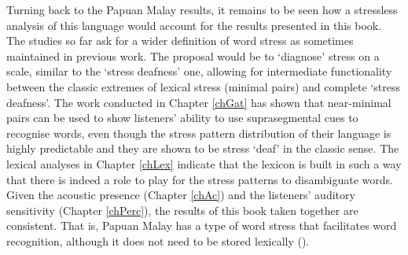 Turning back to the Papuan Malay results, it remains to be seen how a stressless analysis of this language would account for the results presented in this book. The studies so far ask for a wider definition of word stress as sometimes maintained in previous work. The proposal would be to `diagnose' stress on a scale, similar to the `stress deafness' one, allowing for intermediate functionality between the classic extremes of lexical stress (minimal pairs) and complete `stress deafness'. The work conducted in Chapter \ref{chGat} has shown that near-minimal pairs can be used to show listeners' ability to use suprasegmental cues to recognise words, even though the stress pattern distribution of their language is highly predictable and they are shown to be stress `deaf' in the classic sense. The lexical analyses in Chapter \ref{chLex} indicate that the lexicon is built in such a way that there is indeed a role to play for the stress patterns to disambiguate words. Given the acoustic presence (Chapter \ref{chAc}) and the listeners' auditory sensitivity (Chapter \ref{chPerc}), the results of this book taken together are consistent. That is, Papuan Malay has a type of word stress that facilitates word recognition, although it does not need to be stored lexically (\citealt{kaland_when_2024}).\par

